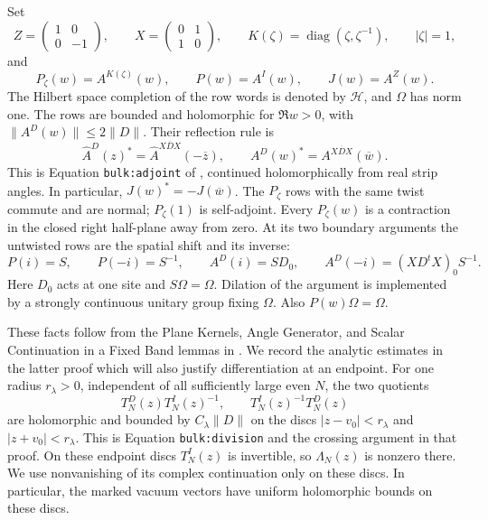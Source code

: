 Set
\[
 Z=\begin{pmatrix}1&0\\0&-1\end{pmatrix},\qquad
 X=\begin{pmatrix}0&1\\1&0\end{pmatrix},\qquad
 K(\zeta)=\operatorname{diag}(\zeta,\zeta^{-1}),
 \qquad |\zeta|=1,
\]
and
\[
 P_\zeta(w)=A^{K(\zeta)}(w),\qquad
 P(w)=A^I(w),\qquad J(w)=A^Z(w).
\]
The Hilbert space completion of the row words is denoted by
$\mathcal H$, and $\Omega$ has norm one.  The rows are bounded and
holomorphic for $\Re w>0$, with $\|A^D(w)\|\le2\|D\|$.
Their reflection rule is
\begin{equation}\label{eq:row-adjoint}
 \widehat A^D(z)^*
 =\widehat A^{X\overline D X}(-\overline z),\qquad
 A^D(w)^*=A^{X\overline D X}(\overline w).
\end{equation}
This is Equation \texttt{bulk:adjoint} of \cite{FKCompanion},
continued holomorphically from real strip angles.  In particular,
$J(w)^*=-J(\overline w)$.
The $P_\zeta$ rows with the same twist commute and are normal;
$P_\zeta(1)$ is self-adjoint.  Every $P_\zeta(w)$ is a
contraction in the closed right half-plane away from zero.  At its two boundary
arguments the untwisted rows are the spatial shift and its inverse:
\begin{equation}\label{eq:spectral-endpoints}
 P(i)=S,\qquad P(-i)=S^{-1},\qquad
 A^D(i)=SD_0,\qquad A^D(-i)=(XD^tX)_0S^{-1}.
\end{equation}
Here $D_0$ acts at one site and $S\Omega=\Omega$.  Dilation of the
argument is implemented by a strongly continuous unitary group fixing
$\Omega$.  Also $P(w)\Omega=\Omega$.

These facts follow from the Plane Kernels, Angle Generator, and
Scalar Continuation in a Fixed Band lemmas in
\cite[Section ``Angular transfer and its two leading modes'']{FKCompanion}.
We record the analytic estimates in the latter proof which will
also justify differentiation at an endpoint.  For one radius
$r_\lambda>0$, independent of all sufficiently large even $N$,
the two quotients
\begin{equation}\label{eq:finite-endpoint-division}
 T_N^D(z)T_N^I(z)^{-1},\qquad T_N^I(z)^{-1}T_N^D(z)
\end{equation}
are holomorphic and bounded by $C_\lambda\|D\|$ on the discs
$|z-v_0|<r_\lambda$ and $|z+v_0|<r_\lambda$.
This is Equation \texttt{bulk:division} and the crossing argument
in that proof.  On these endpoint discs $T_N^I(z)$ is invertible,
so $\Lambda_N(z)$ is nonzero there.  We use nonvanishing of its
complex continuation only on these discs.  In particular, the marked vacuum vectors have
uniform holomorphic bounds on these discs.

